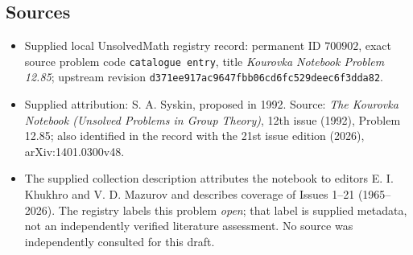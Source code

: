 \documentclass[11pt]{article}
\begin{document}
\subsection{Sources}
\begin{itemize}
\item Supplied local UnsolvedMath registry record: permanent ID \(700902\), exact source problem code \texttt{catalogue entry}, title \emph{Kourovka Notebook Problem 12.85}; upstream revision \texttt{d371ee917ac9647fbb06cd6fc529deec6f3dda82}.
\item Supplied attribution: S. A. Syskin, proposed in 1992. Source: \emph{The Kourovka Notebook (Unsolved Problems in Group Theory)}, 12th issue (1992), Problem 12.85; also identified in the record with the 21st issue edition (2026), arXiv:1401.0300v48.
\item The supplied collection description attributes the notebook to editors E. I. Khukhro and V. D. Mazurov and describes coverage of Issues 1--21 (1965--2026). The registry labels this problem \emph{open}; that label is supplied metadata, not an independently verified literature assessment. No source was independently consulted for this draft.
\end{itemize}
\end{document}
